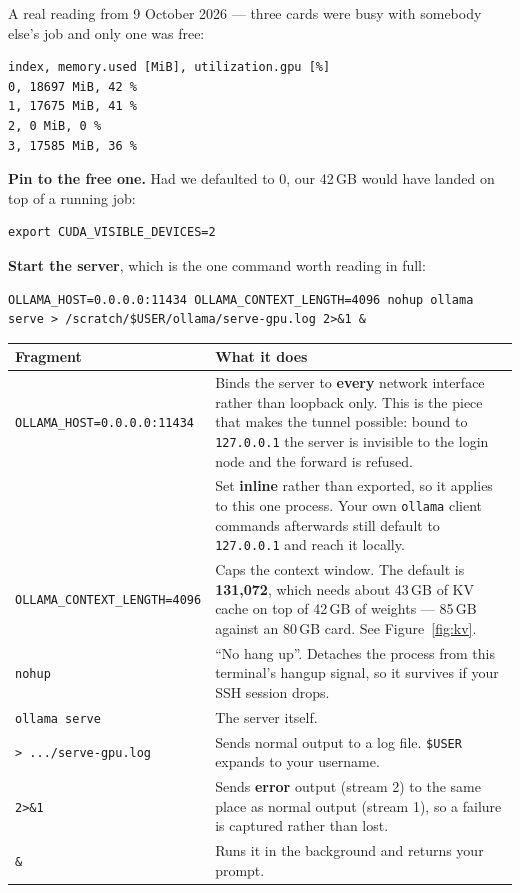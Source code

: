 \documentclass[11pt,a4paper]{article}
\begin{document}
A real reading from 9 October 2026 --- three cards were busy with somebody else's
job and only one was free:

\begin{lstlisting}
index, memory.used [MiB], utilization.gpu [%]
0, 18697 MiB, 42 %
1, 17675 MiB, 41 %
2, 0 MiB, 0 %
3, 17585 MiB, 36 %
\end{lstlisting}

\textbf{Pin to the free one.} Had we defaulted to 0, our 42\,GB would have landed
on top of a running job:

\begin{lstlisting}
export CUDA_VISIBLE_DEVICES=2
\end{lstlisting}

\textbf{Start the server}, which is the one command worth reading in full:

\begin{lstlisting}
OLLAMA_HOST=0.0.0.0:11434 OLLAMA_CONTEXT_LENGTH=4096 nohup ollama serve > /scratch/$USER/ollama/serve-gpu.log 2>&1 &
\end{lstlisting}

\begin{center}
\begin{tabularx}{\linewidth}{@{}>{\raggedright\arraybackslash}p{4.4cm} X@{}}
\toprule
\textbf{Fragment} & \textbf{What it does} \\
\midrule
\texttt{OLLAMA\_HOST=0.0.0.0:11434} & Binds the server to \textbf{every} network
interface rather than loopback only. This is the piece that makes the tunnel
possible: bound to \texttt{127.0.0.1} the server is invisible to the login node
and the forward is refused. \\
& Set \textbf{inline} rather than exported, so it applies to this one process.
Your own \texttt{ollama} client commands afterwards still default to
\texttt{127.0.0.1} and reach it locally. \\
\texttt{OLLAMA\_CONTEXT\_LENGTH=4096} & Caps the context window. The default is
\textbf{131{,}072}, which needs about 43\,GB of KV cache on top of 42\,GB of
weights --- 85\,GB against an 80\,GB card. See Figure~\ref{fig:kv}. \\
\texttt{nohup} & ``No hang up''. Detaches the process from this terminal's
hangup signal, so it survives if your SSH session drops. \\
\texttt{ollama serve} & The server itself. \\
\texttt{> .../serve-gpu.log} & Sends normal output to a log file.
\texttt{\$USER} expands to your username. \\
\texttt{2>\&1} & Sends \textbf{error} output (stream 2) to the same place as
normal output (stream 1), so a failure is captured rather than lost. \\
\texttt{\&} & Runs it in the background and returns your prompt. \\
\bottomrule
\end{tabularx}
\end{center}
\end{document}

